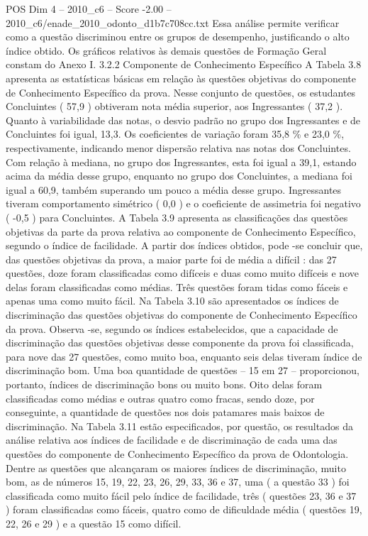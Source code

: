 \begin{textsample}{POS Dim 4 – 2010\_c6 – Score -2.00 – 2010\_c6/enade\_2010\_odonto\_d1b7c708cc.txt}
Essa análise permite verificar como a questão discriminou entre os grupos de desempenho, justificando o alto índice obtido.
Os gráficos relativos às demais questões de Formação Geral constam do Anexo I. 3.2.2 Componente de Conhecimento Específico A Tabela 3.8 apresenta as estatísticas básicas em relação às questões objetivas do componente de Conhecimento Específico da prova.
Nesse conjunto de questões, os estudantes Concluintes ( 57,9 ) obtiveram nota média superior, aos Ingressantes ( 37,2 ).
Quanto à variabilidade das notas, o desvio padrão no grupo dos Ingressantes e de Concluintes foi igual, 13,3.
Os coeficientes de variação foram 35,8 \% e 23,0 \%, respectivamente, indicando menor dispersão relativa nas notas dos Concluintes.
Com relação à mediana, no grupo dos Ingressantes, esta foi igual a 39,1, estando acima da média desse grupo, enquanto no grupo dos Concluintes, a mediana foi igual a 60,9, também superando um pouco a média desse grupo.
Ingressantes tiveram comportamento simétrico ( 0,0 ) e o coeficiente de assimetria foi negativo ( -0,5 ) para Concluintes.
A Tabela 3.9 apresenta as classificações das questões objetivas da parte da prova relativa ao componente de Conhecimento Específico, segundo o índice de facilidade.
A partir dos índices obtidos, pode -se concluir que, das questões objetivas da prova, a maior parte foi de média a difícil : das 27 questões, doze foram classificadas como difíceis e duas como muito difíceis e nove delas foram classificadas como médias.
Três questões foram tidas como fáceis e apenas uma como muito fácil.
Na Tabela 3.10 são apresentados os índices de discriminação das questões objetivas do componente de Conhecimento Específico da prova.
Observa -se, segundo os índices estabelecidos, que a capacidade de discriminação das questões objetivas desse componente da prova foi classificada, para nove das 27 questões, como muito boa, enquanto seis delas tiveram índice de discriminação bom.
Uma boa quantidade de questões – 15 em 27 – proporcionou, portanto, índices de discriminação bons ou muito bons.
Oito delas foram classificadas como médias e outras quatro como fracas, sendo doze, por conseguinte, a quantidade de questões nos dois patamares mais baixos de discriminação.
Na Tabela 3.11 estão especificados, por questão, os resultados da análise relativa aos índices de facilidade e de discriminação de cada uma das questões do componente de Conhecimento Específico da prova de Odontologia.
Dentre as questões que alcançaram os maiores índices de discriminação, muito bom, as de números 15, 19, 22, 23, 26, 29, 33, 36 e 37, uma ( a questão 33 ) foi classificada como muito fácil pelo índice de facilidade, três ( questões 23, 36 e 37 ) foram classificadas como fáceis, quatro como de dificuldade média ( questões 19, 22, 26 e 29 ) e a questão 15 como difícil.

\end{textsample}
